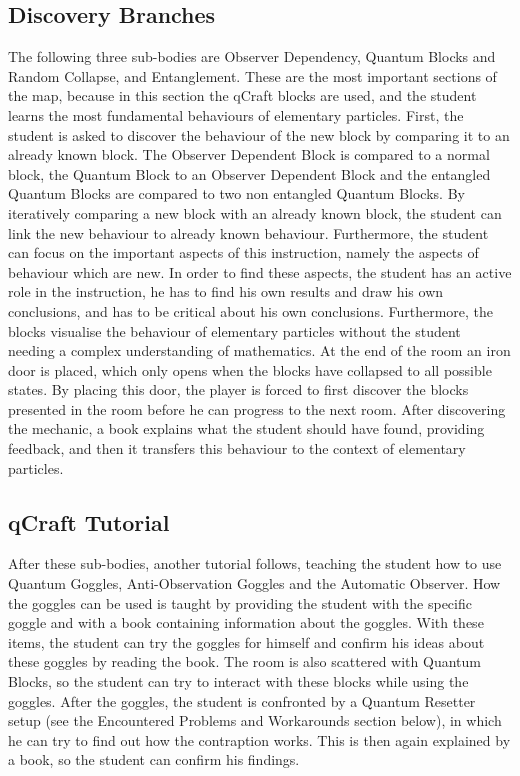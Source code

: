 \documentclass[11pt,twoside]{report} %
\begin{document}
\subsection{Discovery Branches}

The following three sub-bodies are Observer Dependency, Quantum Blocks and Random Collapse, and Entanglement. These are the most important sections of the map, because in this section the qCraft blocks are used, and the student learns the most fundamental behaviours of elementary particles. First, the student is asked to discover the behaviour of the new block by comparing it to an already known block. The Observer Dependent Block is compared to a normal block, the Quantum Block to an Observer Dependent Block and the entangled Quantum Blocks are compared to two non entangled Quantum Blocks. By iteratively comparing a new block with an already known block, the student can link the new behaviour to already known behaviour. Furthermore, the student can focus on the important aspects of this instruction, namely the aspects of behaviour which are new. In order to find these aspects, the student has an active role in the instruction, he has to find his own results and draw his own conclusions, and has to be critical about his own conclusions. Furthermore, the blocks visualise the behaviour of elementary particles without the student needing a complex understanding of mathematics. At the end of the room an iron door is placed, which only opens when the blocks have collapsed to all possible states. By placing this door, the player is forced to first discover the blocks presented in the room before he can progress to the next room. After discovering the mechanic, a book explains what the student should have found, providing feedback, and then it transfers this behaviour to the context of elementary particles.

\subsection{qCraft Tutorial}

After these sub-bodies, another tutorial follows, teaching the student how to use Quantum Goggles, Anti-Observation Goggles and the Automatic Observer. How the goggles can be used is taught by providing the student with the specific goggle and with a book containing information about the goggles. With these items, the student can try the goggles for himself and confirm his ideas about these goggles by reading the book. The room is also scattered with Quantum Blocks, so the student can try to interact with these blocks while using the goggles. After the goggles, the student is confronted by a Quantum Resetter setup (see the Encountered Problems and Workarounds section below), in which he can try to find out how the contraption works. This is then again explained by a book, so the student can confirm his findings.
\end{document}
